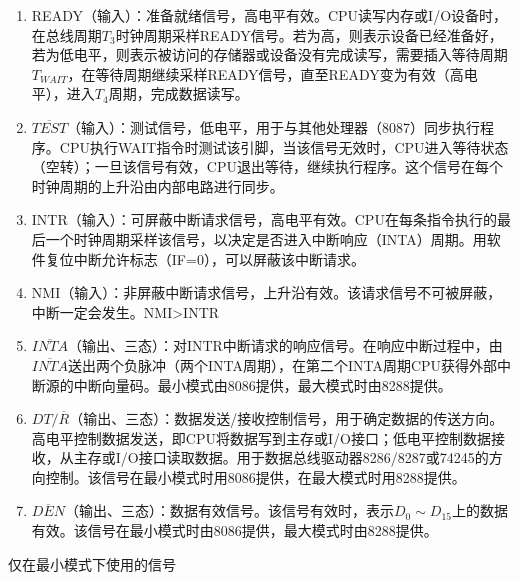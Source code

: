 \documentclass{article}
\begin{document}
\begin{enumerate}
\item  READY（输入）：准备就绪信号，高电平有效。CPU读写内存或I/O设备时，在总线周期$T_3$时钟周期采样READY信号。若为高，则表示设备已经准备好，若为低电平，则表示被访问的存储器或设备没有完成读写，需要插入等待周期$T_{WAIT}$，在等待周期继续采样READY信号，直至READY变为有效（高电平），进入$T_4$周期，完成数据读写。

\item  $\overline{TEST}$（输入）：测试信号，低电平，用于与其他处理器（8087）同步执行程序。CPU执行WAIT指令时测试该引脚，当该信号无效时，CPU进入等待状态（空转）；一旦该信号有效，CPU退出等待，继续执行程序。这个信号在每个时钟周期的上升沿由内部电路进行同步。

\item INTR（输入）：可屏蔽中断请求信号，高电平有效。CPU在每条指令执行的最后一个时钟周期采样该信号，以决定是否进入中断响应（INTA）周期。用软件复位中断允许标志（IF=0），可以屏蔽该中断请求。

\item NMI（输入）：非屏蔽中断请求信号，上升沿有效。该请求信号不可被屏蔽，中断一定会发生。NMI>INTR

\item $\overline{INTA}$（输出、三态）：对INTR中断请求的响应信号。在响应中断过程中，由$\overline{INTA}$送出两个负脉冲（两个INTA周期），在第二个INTA周期CPU获得外部中断源的中断向量码。最小模式由8086提供，最大模式时由8288提供。

\item $DT/\overline{R}$（输出、三态）：数据发送/接收控制信号，用于确定数据的传送方向。高电平控制数据发送，即CPU将数据写到主存或I/O接口；低电平控制数据接收，从主存或I/O接口读取数据。用于数据总线驱动器8286/8287或74245的方向控制。该信号在最小模式时用8086提供，在最大模式时用8288提供。

\item $\overline{DEN}$（输出、三态）：数据有效信号。该信号有效时，表示$D_0 \sim D_{15}$上的数据有效。该信号在最小模式时由8086提供，最大模式时由8288提供。

\end{enumerate}
仅在最小模式下使用的信号
\end{document}
